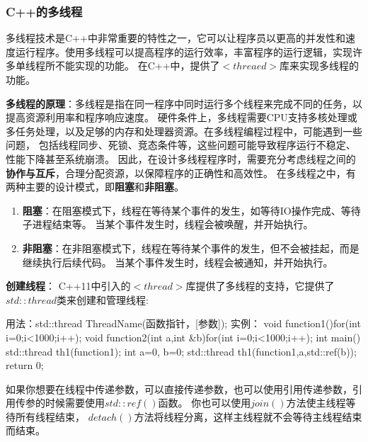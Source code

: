 \subsubsection{C++的多线程}

多线程技术是C++中非常重要的特性之一，它可以让程序员以更高的并发性和速度运行程序。使用多线程可以提高程序的运行效率，丰富程序的运行逻辑，实现许多单线程所不能实现的功能。
在C++中，提供了$<threaed>$库来实现多线程的功能。

\textbf{多线程的原理}：多线程是指在同一程序中同时运行多个线程来完成不同的任务，以提高资源利用率和程序响应速度。
硬件条件上，多线程需要CPU支持多核处理或多任务处理，以及足够的内存和处理器资源。在多线程编程过程中，可能遇到一些问题，
包括线程同步、死锁、竞态条件等，这些问题可能导致程序运行不稳定、性能下降甚至系统崩溃。
因此，在设计多线程程序时，需要充分考虑线程之间的\textbf{协作与互斥}，合理分配资源，以保障程序的正确性和高效性。
在多线程之中，有两种主要的设计模式，即\textbf{阻塞}和\textbf{非阻塞}。

\begin{enumerate}
    \item \textbf{阻塞}：在阻塞模式下，线程在等待某个事件的发生，如等待IO操作完成、等待子进程结束等。
当某个事件发生时，线程会被唤醒，并开始执行。

    \item \textbf{非阻塞}：在非阻塞模式下，线程在等待某个事件的发生，但不会被挂起，而是继续执行后续代码。
当某个事件发生时，线程会被通知，并开始执行。
\end{enumerate}


\textbf{创建线程}：
C++11中引入的$<thread>$库提供了多线程的支持，它提供了$std::thread$类来创建和管理线程:

\begin{tcode}
用法：std::thread ThreadName(函数指针，[参数]);
实例：
void function1(){for(int i=0;i<1000;i++);}
void function2(int a,int &b){for(int i=0;i<1000;i++);}
int main() {
    std::thread th1(function1);
    int a=0, b=0;
    std::thread th1(function1,a,std::ref(b));
    return 0;
}
\end{tcode}

如果你想要在线程中传递参数，可以直接传递参数，也可以使用引用传递参数，引用传参的时候需要使用$std::ref()$函数。
你也可以使用$join()$方法使主线程等待所有线程结束，
$detach()$方法将线程分离，这样主线程就不会等待主线程结束而结束。

